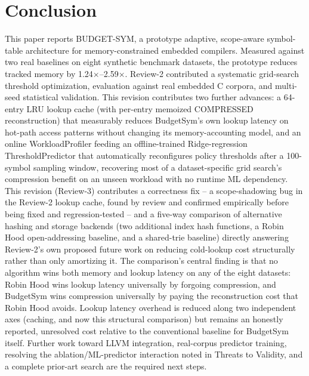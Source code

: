 \documentclass[conference]{IEEEtran}
\begin{document}
\section{Conclusion}
This paper reports BUDGET-SYM, a prototype adaptive, scope-aware
symbol-table architecture for memory-constrained embedded compilers.
Measured against two real baselines on eight synthetic benchmark datasets,
the prototype reduces tracked memory by 1.24$\times$--2.59$\times$. Review-2
contributed a systematic grid-search threshold optimization, evaluation
against real embedded C corpora, and multi-seed statistical validation. This
revision contributes two further advances: a 64-entry LRU lookup cache
(with per-entry memoized COMPRESSED reconstruction) that measurably reduces
BudgetSym's own lookup latency on hot-path access patterns without changing
its memory-accounting model, and an online WorkloadProfiler feeding an
offline-trained Ridge-regression ThresholdPredictor that automatically
reconfigures policy thresholds after a 100-symbol sampling window, recovering
most of a dataset-specific grid search's compression benefit on an unseen
workload with no runtime ML dependency. This revision (Review-3) contributes
a correctness fix -- a scope-shadowing bug in the Review-2 lookup cache,
found by review and confirmed empirically before being fixed and
regression-tested -- and a five-way comparison of alternative hashing and
storage backends (two additional index hash functions, a Robin Hood
open-addressing baseline, and a shared-trie baseline) directly answering
Review-2's own proposed future work on reducing cold-lookup cost
structurally rather than only amortizing it. The comparison's central
finding is that no algorithm wins both memory and lookup latency on any of
the eight datasets: Robin Hood wins lookup latency universally by forgoing
compression, and BudgetSym wins compression universally by paying the
reconstruction cost that Robin Hood avoids. Lookup latency overhead is
reduced along two independent axes (caching, and now this structural
comparison) but remains an honestly reported, unresolved cost relative to
the conventional baseline for BudgetSym itself. Further work toward LLVM
integration, real-corpus predictor training, resolving the
ablation/ML-predictor interaction noted in Threats to Validity, and a
complete prior-art search are the required next steps.
\end{document}
